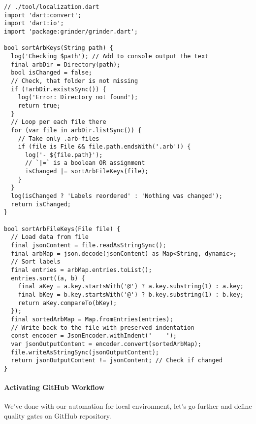 \begin{lstlisting}
// ./tool/localization.dart
import 'dart:convert';
import 'dart:io';
import 'package:grinder/grinder.dart';

bool sortArbKeys(String path) {
  log('Checking $path'); // Add to console output the text
  final arbDir = Directory(path);
  bool isChanged = false;
  // Check, that folder is not missing
  if (!arbDir.existsSync()) {
    log('Error: Directory not found');
    return true;
  }
  // Loop per each file there
  for (var file in arbDir.listSync()) {
    // Take only .arb-files
    if (file is File && file.path.endsWith('.arb')) {
      log('- ${file.path}');
      // `|=` is a boolean OR assignment
      isChanged |= sortArbFileKeys(file);
    }
  }
  log(isChanged ? 'Labels reordered' : 'Nothing was changed');
  return isChanged;
}

bool sortArbFileKeys(File file) {
  // Load data from file
  final jsonContent = file.readAsStringSync();
  final arbMap = json.decode(jsonContent) as Map<String, dynamic>;
  // Sort labels
  final entries = arbMap.entries.toList();
  entries.sort((a, b) {
    final aKey = a.key.startsWith('@') ? a.key.substring(1) : a.key;
    final bKey = b.key.startsWith('@') ? b.key.substring(1) : b.key;
    return aKey.compareTo(bKey);
  });
  final sortedArbMap = Map.fromEntries(entries);
  // Write back to the file with preserved indentation
  const encoder = JsonEncoder.withIndent('    ');
  var jsonOutputContent = encoder.convert(sortedArbMap);
  file.writeAsStringSync(jsonOutputContent);
  return jsonOutputContent != jsonContent; // Check if changed
}
\end{lstlisting}

\paragraph{Activating GitHub Workflow}

We've done with our automation for local environment, let's go further and define quality gates on GitHub repository.

